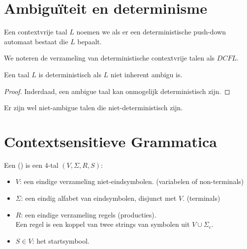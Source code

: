 \documentclass[main.tex]{subfiles}
\begin{document}
\section{Ambigu\"iteit en determinisme}

\begin{de}
  Een contextvrije taal $L$ noemen we  als er een deterministische push-down automaat bestaat die $L$ bepaalt.
\end{de}

\begin{de}
  We noteren de verzameling van deterministische contextvrije talen als $DCFL$.
\end{de}

\begin{st}
  Een taal $L$ is deterministisch als $L$ niet inherent ambigu is.
  \begin{proof}
    Inderdaad, een ambigue taal kan onmogelijk deterministisch zijn.
  \end{proof}
\end{st}

\begin{opm}
  Er zijn wel niet-ambigue talen die niet-deterministisch zijn.
\end{opm}


\section{Contextsensitieve Grammatica}

\begin{de}
  Een  () is een $4$-tal $(V,\Sigma,R,S)$:
  \begin{itemize}
  \item $V$: een eindige verzameling niet-eindsymbolen. (variabelen of non-terminals)
  \item $\Sigma$: een eindig alfabet van eindsymbolen, disjunct met $V$. (terminals)
  \item $R$: een eindige verzameling regels (producties).\\
    Een regel is een koppel van twee strings van symbolen uit $V \cup \Sigma_{\epsilon}$.
  \item $S\in V$: het startsymbool.
  \end{itemize}
\end{de}
\end{document}
